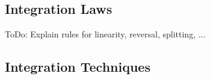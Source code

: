 


\subsection{Integration Laws} 
ToDo: Explain rules for linearity, reversal, splitting, ...




\subsection{Integration Techniques} 

